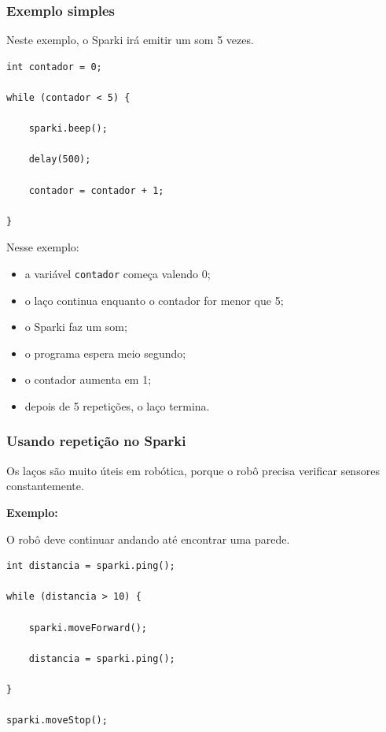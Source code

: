 \documentclass[conference]{IEEEtran}
\begin{document}
\subsubsection{Exemplo simples}

Neste exemplo, o Sparki irá emitir um som 5 vezes.

\begin{lstlisting}[caption={Repetindo uma acao}]
int contador = 0;

while (contador < 5) {

    sparki.beep();

    delay(500);

    contador = contador + 1;

}
\end{lstlisting}

\vspace{0.2cm}

Nesse exemplo:
\begin{itemize}
    \item a variável \texttt{contador} começa valendo 0;
    \item o laço continua enquanto o contador for menor que 5;
    \item o Sparki faz um som;
    \item o programa espera meio segundo;
    \item o contador aumenta em 1;
    \item depois de 5 repetições, o laço termina.
\end{itemize}

\vspace{0.3cm}

\subsubsection{Usando repetição no Sparki}

Os laços são muito úteis em robótica, porque o robô precisa verificar sensores constantemente.

\vspace{0.2cm}

\textbf{Exemplo:}

O robô deve continuar andando até encontrar uma parede.

\begin{lstlisting}[caption={Sparki andando ate encontrar obstaculo}]
int distancia = sparki.ping();

while (distancia > 10) {

    sparki.moveForward();

    distancia = sparki.ping();

}

sparki.moveStop();
\end{lstlisting}
\end{document}
